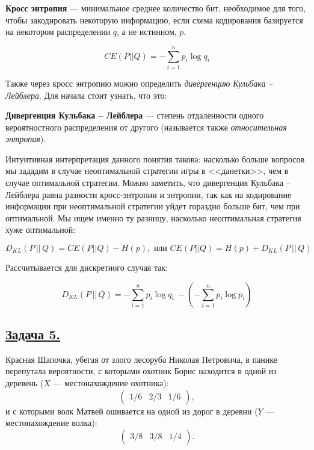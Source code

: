 \begin{siderules}
    \textbf{Кросс энтропия} --- минимальное среднее количество бит, необходимое для того, чтобы закодировать некоторую информацию, если схема кодирования базируется на некотором распределении $q$, а не истинном, $p$.
\end{siderules}

\[CE(P||Q)=-\sum\limits_{i=1}^{n}p_i\log q_i \]

Также через кросс энтропию можно определить \textit{дивергенцию Кульбака -- Лейблера}. Для начала стоит узнать, что это:

\begin{siderules}
    \textbf{Дивергенция Кульбака -- Лейблера} --- степень отдаленности одного вероятностного распределения от другого (называется также \textit{относительная энтропия}). \end{siderules}
    
    Интуитивная интерпретация данного понятия такова: насколько больше вопросов мы зададим в случае неоптимальной стратегии игры в <<данетки>>, чем в случае оптимальной стратегии. Можно заметить, что дивергенция Кульбака -- Лейблера равна разности кросс-энтропии и энтропии, так как на кодирование информации при неоптимальной стратегии уйдет гораздно больше бит, чем при оптимальной. Мы ищем именно ту разницу, насколько неоптимальная стратегия хуже оптимальной: 
    
    \[D_{KL}(P\, ||\, Q)= CE(P||Q) - H(p), \text{ или } CE(P||Q)=H(p)+D_{KL}(P\, || \, Q)\]
    
    Рассчитывается для дискретного случая так:

    \[D_{KL}(P\, ||\, Q)=  - \sum\limits_{i=1}^n p_i\log q_i\ - ( - \sum\limits_{i=1}^n p_i\log p_i)\]



\subsection*{\hyperref[sec:sol_problem5]{Задача 5.}}\label{sec:problem5} Красная Шапочка, убегая от злого лесоруба Николая Петровича, в панике перепутала вероятности, с которыми охотник Борис находится в одной из деревень ($X$ --- местонахождение охотника):
\[\begin{pmatrix}
    1/6 & 2/3 & 1/6
\end{pmatrix} , \] и с которыми волк Матвей ошивается на одной из дорог в деревни ($Y$ --- местонахождение волка):
\[\begin{pmatrix}
    3/8 & 3/8 & 1/4 
\end{pmatrix} .\]

